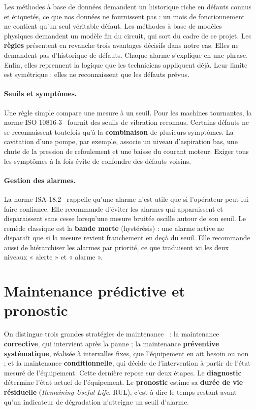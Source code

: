 Les méthodes à base de données demandent un historique riche en défauts connus et étiquetés, ce que nos données ne fournissent pas : un mois de fonctionnement ne contient qu'un seul véritable défaut. Les méthodes à base de modèles physiques demandent un modèle fin du circuit, qui sort du cadre de ce projet. Les \textbf{règles} présentent en revanche trois avantages décisifs dans notre cas. Elles ne demandent pas d'historique de défauts. Chaque alarme s'explique en une phrase. Enfin, elles reprennent la logique que les techniciens appliquent déjà. Leur limite est symétrique : elles ne reconnaissent que les défauts prévus.

\paragraph{Seuils et symptômes.} Une règle simple compare une mesure à un seuil. Pour les machines tournantes, la norme ISO 10816-3~\cite{iso10816} fournit des seuils de vibration reconnus. Certains défauts ne se reconnaissent toutefois qu'à la \textbf{combinaison} de plusieurs symptômes. La cavitation d'une pompe, par exemple, associe un niveau d'aspiration bas, une chute de la pression de refoulement et une baisse du courant moteur. Exiger tous les symptômes à la fois évite de confondre des défauts voisins.

\paragraph{Gestion des alarmes.} La norme ISA-18.2~\cite{isa182} rappelle qu'une alarme n'est utile que si l'opérateur peut lui faire confiance. Elle recommande d'éviter les alarmes qui apparaissent et disparaissent sans cesse lorsqu'une mesure bruitée oscille autour de son seuil. Le remède classique est la \textbf{bande morte} (hystérésis) : une alarme active ne disparaît que si la mesure revient franchement en deçà du seuil. Elle recommande aussi de hiérarchiser les alarmes par priorité, ce que traduisent ici les deux niveaux « alerte » et « alarme ».

\section{Maintenance prédictive et pronostic}
On distingue trois grandes stratégies de maintenance~\cite{jardine2006} : la maintenance \textbf{corrective}, qui intervient après la panne ; la maintenance \textbf{préventive systématique}, réalisée à intervalles fixes, que l'équipement en ait besoin ou non ; et la maintenance \textbf{conditionnelle}, qui décide de l'intervention à partir de l'état mesuré de l'équipement. Cette dernière repose sur deux étapes. Le \textbf{diagnostic} détermine l'état actuel de l'équipement. Le \textbf{pronostic} estime sa \textbf{durée de vie résiduelle} (\textit{Remaining Useful Life}, RUL), c'est-à-dire le temps restant avant qu'un indicateur de dégradation n'atteigne un seuil d'alarme.

